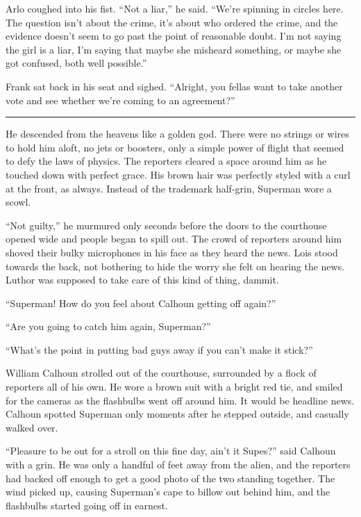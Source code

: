 \documentclass[ebook,12pt]{memoir}
\begin{document}
Arlo coughed into his fist. ``Not a liar,'' he said. ``We're spinning in
circles here. The question isn't about the crime, it's about who ordered
the crime, and the evidence doesn't seem to go past the point of
reasonable doubt. I'm not saying the girl is a liar, I'm saying that
maybe she misheard something, or maybe she got confused, both well
possible.''

Frank sat back in his seat and sighed. ``Alright, you fellas want to
take another vote and see whether we're coming to an agreement?''

\begin{center}\rule{0.5\linewidth}{\linethickness}\end{center}

He descended from the heavens like a golden god. There were no strings
or wires to hold him aloft, no jets or boosters, only a simple power of
flight that seemed to defy the laws of physics. The reporters cleared a
space around him as he touched down with perfect grace. His brown hair
was perfectly styled with a curl at the front, as always. Instead of the
trademark half‐grin, Superman wore a scowl.

``Not guilty,'' he murmured only seconds before the doors to the
courthouse opened wide and people began to spill out. The crowd of
reporters around him shoved their bulky microphones in his face as they
heard the news. Lois stood towards the back, not bothering to hide the
worry she felt on hearing the news. Luthor was supposed to take care of
this kind of thing, dammit.

``Superman! How do you feel about Calhoun getting off again?''

``Are you going to catch him again, Superman?''

``What's the point in putting bad guys away if you can't make it
stick?''

William Calhoun strolled out of the courthouse, surrounded by a flock of
reporters all of his own. He wore a brown suit with a bright red tie,
and smiled for the cameras as the flashbulbs went off around him. It
would be headline news. Calhoun spotted Superman only moments after he
stepped outside, and casually walked over.

``Pleasure to be out for a stroll on this fine day, ain't it Supes?''
said Calhoun with a grin. He was only a handful of feet away from the
alien, and the reporters had backed off enough to get a good photo of
the two standing together. The wind picked up, causing Superman's cape
to billow out behind him, and the flashbulbs started going off in
earnest.
\end{document}
